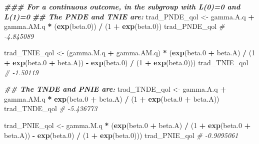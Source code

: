 \documentclass[
]{book}
\newenvironment{Shaded}{\begin{snugshade}}{\end{snugshade}}
\newcommand{\CommentTok}[1]{\textcolor[rgb]{0.56,0.35,0.01}{\textit{#1}}}
\newcommand{\DecValTok}[1]{\textcolor[rgb]{0.00,0.00,0.81}{#1}}
\newcommand{\DocumentationTok}[1]{\textcolor[rgb]{0.56,0.35,0.01}{\textbf{\textit{#1}}}}
\newcommand{\FloatTok}[1]{\textcolor[rgb]{0.00,0.00,0.81}{#1}}
\newcommand{\FunctionTok}[1]{\textcolor[rgb]{0.13,0.29,0.53}{\textbf{#1}}}
\newcommand{\NormalTok}[1]{#1}
\newcommand{\OtherTok}[1]{\textcolor[rgb]{0.56,0.35,0.01}{#1}}
\newcommand{\SpecialCharTok}[1]{\textcolor[rgb]{0.81,0.36,0.00}{\textbf{#1}}}
\begin{document}
\begin{Shaded}
\begin{Highlighting}[]
\DocumentationTok{\#\#\# For a continuous outcome, in the subgroup with L(0)=0 and L(1)=0}
\DocumentationTok{\#\# The PNDE and TNIE are:}
\NormalTok{trad\_PNDE\_qol }\OtherTok{\textless{}{-}}\NormalTok{ gamma.A.q }\SpecialCharTok{+}\NormalTok{ gamma.AM.q }\SpecialCharTok{*}\NormalTok{ (}\FunctionTok{exp}\NormalTok{(beta}\FloatTok{.0}\NormalTok{)) }\SpecialCharTok{/}\NormalTok{ (}\DecValTok{1} \SpecialCharTok{+} \FunctionTok{exp}\NormalTok{(beta}\FloatTok{.0}\NormalTok{))}
\NormalTok{trad\_PNDE\_qol}
\CommentTok{\# {-}4.845089}

\NormalTok{trad\_TNIE\_qol }\OtherTok{\textless{}{-}}\NormalTok{ (gamma.M.q }\SpecialCharTok{+}\NormalTok{ gamma.AM.q) }\SpecialCharTok{*}
\NormalTok{  (}\FunctionTok{exp}\NormalTok{(beta}\FloatTok{.0} \SpecialCharTok{+}\NormalTok{ beta.A) }\SpecialCharTok{/}\NormalTok{ (}\DecValTok{1} \SpecialCharTok{+} \FunctionTok{exp}\NormalTok{(beta}\FloatTok{.0} \SpecialCharTok{+}\NormalTok{ beta.A)) }\SpecialCharTok{{-}}
     \FunctionTok{exp}\NormalTok{(beta}\FloatTok{.0}\NormalTok{) }\SpecialCharTok{/}\NormalTok{ (}\DecValTok{1} \SpecialCharTok{+} \FunctionTok{exp}\NormalTok{(beta}\FloatTok{.0}\NormalTok{)))}
\NormalTok{trad\_TNIE\_qol}
\CommentTok{\# {-}1.50119}

\DocumentationTok{\#\# The TNDE and PNIE are:}
\NormalTok{trad\_TNDE\_qol }\OtherTok{\textless{}{-}}\NormalTok{ gamma.A.q }\SpecialCharTok{+}
\NormalTok{  gamma.AM.q }\SpecialCharTok{*} \FunctionTok{exp}\NormalTok{(beta}\FloatTok{.0} \SpecialCharTok{+}\NormalTok{ beta.A) }\SpecialCharTok{/}\NormalTok{ (}\DecValTok{1} \SpecialCharTok{+} \FunctionTok{exp}\NormalTok{(beta}\FloatTok{.0} \SpecialCharTok{+}\NormalTok{ beta.A))}
\NormalTok{trad\_TNDE\_qol}
\CommentTok{\# {-}5.436773}

\NormalTok{trad\_PNIE\_qol }\OtherTok{\textless{}{-}}\NormalTok{ gamma.M.q }\SpecialCharTok{*}
\NormalTok{  (}\FunctionTok{exp}\NormalTok{(beta}\FloatTok{.0} \SpecialCharTok{+}\NormalTok{ beta.A) }\SpecialCharTok{/}
\NormalTok{     (}\DecValTok{1} \SpecialCharTok{+} \FunctionTok{exp}\NormalTok{(beta}\FloatTok{.0} \SpecialCharTok{+}\NormalTok{ beta.A)) }\SpecialCharTok{{-}} \FunctionTok{exp}\NormalTok{(beta}\FloatTok{.0}\NormalTok{) }\SpecialCharTok{/}\NormalTok{ (}\DecValTok{1} \SpecialCharTok{+} \FunctionTok{exp}\NormalTok{(beta}\FloatTok{.0}\NormalTok{)))}
\NormalTok{trad\_PNIE\_qol}
\CommentTok{\# {-}0.9095061}
\end{Highlighting}
\end{Shaded}
\end{document}
